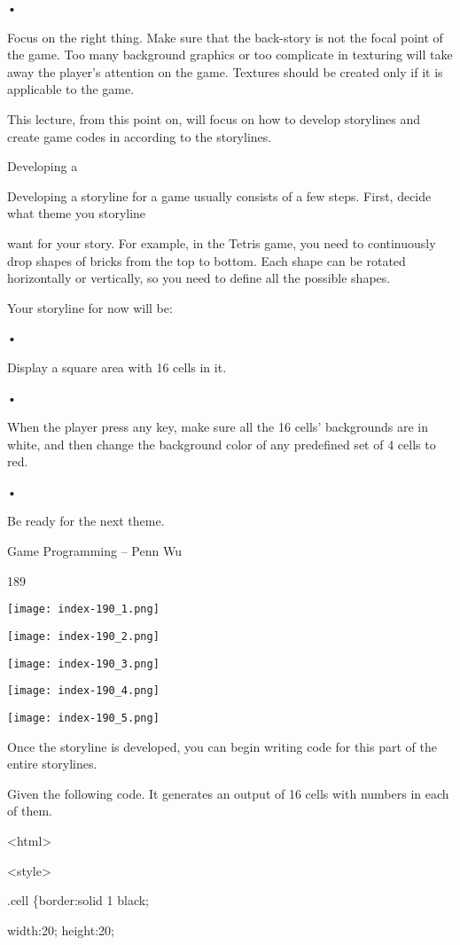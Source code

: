 \documentclass[
]{article}
\begin{document}
•

Focus on the right thing. Make sure that the back-story is not the focal
point of the game. Too many background graphics or too complicate in
texturing will take away the player's attention on the game. Textures
should be created only if it is applicable to the game.

This lecture, from this point on, will focus on how to develop
storylines and create game codes in according to the storylines.

Developing a

Developing a storyline for a game usually consists of a few steps.
First, decide what theme you storyline

want for your story. For example, in the Tetris game, you need to
continuously drop shapes of bricks from the top to bottom. Each shape
can be rotated horizontally or vertically, so you need to define all the
possible shapes.

Your storyline for now will be:

•

Display a square area with 16 cells in it.

•

When the player press any key, make sure all the 16 cells' backgrounds
are in white, and then change the background color of any predefined set
of 4 cells to red.

•

Be ready for the next theme.

Game Programming -- Penn Wu

189

\protect\hypertarget{index_split_011.htmlux5cux23p190}{}{}\texttt{[image: index-190\_1.png]}

\texttt{[image: index-190\_2.png]}

\texttt{[image: index-190\_3.png]}

\texttt{[image: index-190\_4.png]}

\texttt{[image: index-190\_5.png]}

Once the storyline is developed, you can begin writing code for this
part of the entire storylines.

Given the following code. It generates an output of 16 cells with
numbers in each of them.

\textless html\textgreater{}

\textless style\textgreater{}

.cell \{border:solid 1 black;

width:20; height:20;
\end{document}
